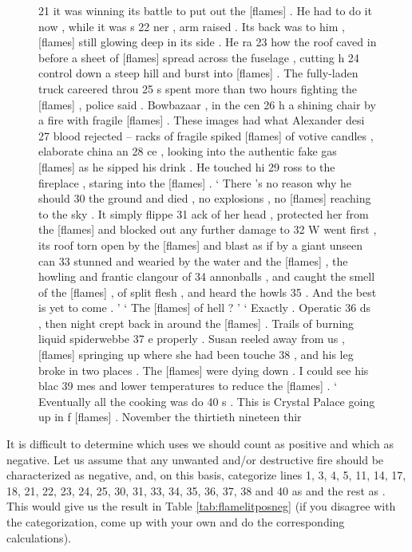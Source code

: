 \begin{figure}[!htbp]
\begin{fitverb}
21  it was winning its battle to put out the [flames] . He had to do it now , while it was s
22  ner , arm raised . Its back was to him , [flames] still glowing deep in its side . He ra
23   how the roof caved in before a sheet of [flames] spread across the fuselage , cutting h
24  control down a steep hill and burst into [flames] . The fully-laden truck careered throu
25  s spent more than two hours fighting the [flames] , police said . Bowbazaar , in the cen
26  h a shining chair by a fire with fragile [flames] . These images had what Alexander desi
27  blood rejected -- racks of fragile spiked [flames] of votive candles , elaborate china an
28  ce , looking into the authentic fake gas [flames] as he sipped his drink . He touched hi
29  ross to the fireplace , staring into the [flames] . ` There 's no reason why he should 
30  the ground and died , no explosions , no [flames] reaching to the sky . It simply flippe
31  ack of her head , protected her from the [flames] and blocked out any further damage to 
32  W went first , its roof torn open by the [flames] and blast as if by a giant unseen can 
33  stunned and wearied by the water and the [flames] , the howling and frantic clangour of 
34  annonballs , and caught the smell of the [flames] , of split flesh , and heard the howls
35   . And the best is yet to come . ' ` The [flames] of hell ? ' ` Exactly . Operatic 
36  ds , then night crept back in around the [flames] . Trails of burning liquid spiderwebbe
37  e properly . Susan reeled away from us , [flames] springing up where she had been touche
38   , and his leg broke in two places . The [flames] were dying down . I could see his blac
39  mes and lower temperatures to reduce the [flames] . ` Eventually all the cooking was do
40  s . This is Crystal Palace going up in f [flames] . November the thirtieth nineteen thir
\end{fitverb}
\end{figure}

It is difficult to determine which uses we should count as positive and which as negative. Let us assume that any unwanted and/or destructive fire should be characterized as negative, and, on this basis, categorize lines 1, 3, 4, 5, 11, 14, 17, 18, 21, 22, 23, 24, 25, 30, 31, 33, 34, 35, 36, 37, 38 and 40 as  and the rest as . This would give us the result in Table \ref{tab:flamelitposneg} (if you disagree with the categorization, come up with your own and do the corresponding calculations).

